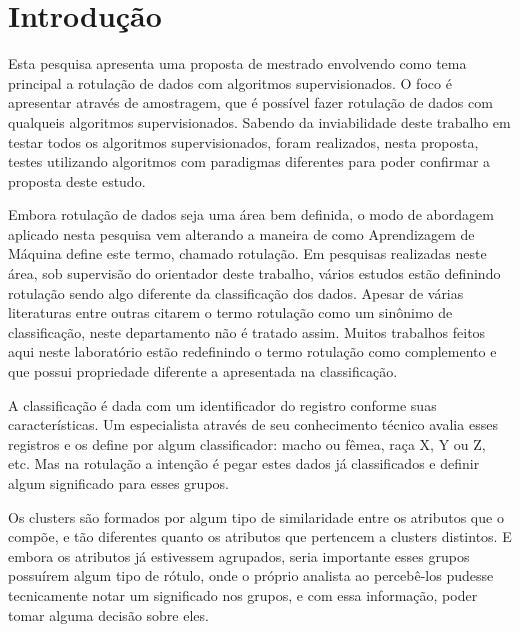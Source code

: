 
\chapter*[Introdução]{Introdução}

Esta pesquisa apresenta uma proposta de mestrado envolvendo como tema principal a rotulação de dados com algoritmos supervisionados. O foco é apresentar através de amostragem, que é possível fazer rotulação de dados com qualqueis algoritmos supervisionados. Sabendo da inviabilidade deste trabalho em  testar todos os algoritmos supervisionados, foram realizados, nesta proposta, testes utilizando algoritmos com paradigmas diferentes para poder confirmar a proposta deste estudo.

Embora rotulação de dados seja uma área bem definida, o modo de abordagem aplicado nesta pesquisa vem alterando a maneira de como Aprendizagem de Máquina define este termo, chamado rotulação. Em pesquisas realizadas neste área, sob supervisão do orientador deste trabalho, vários estudos estão definindo rotulação sendo algo diferente da classificação dos dados. Apesar de várias literaturas \cite{Barber2011,Mitchell1997} entre outras citarem o termo rotulação como um sinônimo de classificação, neste departamento não é tratado assim. Muitos trabalhos feitos aqui neste laboratório estão redefinindo o termo rotulação como complemento e que possui propriedade diferente a apresentada na classificação.

A classificação é dada com um identificador do registro conforme suas características. Um especialista através de seu conhecimento técnico avalia esses registros e os define por algum classificador: macho ou fêmea, raça X, Y ou Z, etc. Mas na rotulação a intenção é pegar estes dados já classificados e definir algum significado para esses grupos. 

Os clusters são formados por algum tipo de similaridade entre os atributos que o compõe, e tão diferentes quanto os atributos que pertencem a  clusters distintos. E embora os atributos já estivessem agrupados, seria importante esses grupos possuírem algum tipo de rótulo, onde o próprio analista ao percebê-los pudesse tecnicamente notar um significado nos grupos, e com essa informação, poder tomar alguma decisão sobre eles. 

